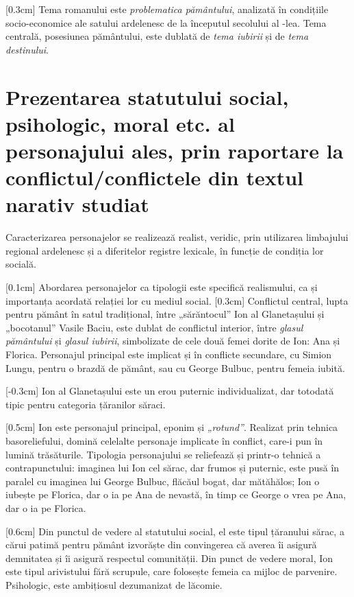 [0.3cm]
Tema romanului este \textit{problematica pământului}, analizată în condițiile so\-ci\-o-e\-co\-no\-mi\-ce ale satului ardelenesc de la începutul secolului al -lea. Tema centrală, posesiunea pământului, este dublată de \textit{tema iubirii} și de \textit{tema destinului}.


{
\hfuzz=0.33pt %
\section{Prezentarea statutului social, psihologic, moral etc. al personajului ales, prin raportare la conflictul/conflictele din textul narativ studiat}
}

Caracterizarea personajelor se realizează realist, veridic, prin utilizarea limbajului regional ardelenesc și a diferitelor registre lexicale, în funcție de condiția lor socială.

[0.1cm]
Abordarea personajelor ca tipologii este specifică realismului, ca și importanța acordată relației lor cu mediul social.
[0.3cm]
Conflictul central, lupta pentru pământ în satul tradițional, între „sărăntocul” Ion al Glanetașului și „bocotanul” Vasile Baciu, este dublat de conflictul interior, între \textit{glasul pământului} și \textit{glasul iubirii}, simbolizate de cele două femei dorite de Ion: Ana și Florica. Personajul principal este implicat și în conflicte secundare, cu Simion Lungu, pentru o brazdă de pământ, sau cu George Bulbuc, pentru femeia iubită.

[-0.3cm]
Ion al Glanetașului este un erou puternic individualizat, dar totodată tipic pentru categoria țăranilor săraci.

[0.5cm]
Ion este personajul principal, eponim și \textit{„rotund”}. Realizat prin tehnica basoreliefului, domină celelalte personaje implicate în conflict, care-i pun în lumină trăsăturile. Tipologia personajului se reliefează și printr-o tehnică a contrapunctului: imaginea lui Ion cel sărac, dar frumos și puternic, este pusă în paralel cu imaginea lui George Bulbuc, flăcăul bogat, dar mătăhălos; Ion o iubește pe Florica, dar o ia pe Ana de nevastă, în timp ce George o vrea pe Ana, dar o ia pe Florica.

[0.6cm]
Din punctul de vedere al statutului social, el este tipul țăranului sărac, a cărui patimă pentru pământ izvorăște din convingerea  că averea îi asigură demnitatea și îi asigură respectul comunității. Din punct de vedere moral, Ion este tipul arivistului fără scrupule, care folosește femeia ca mijloc de parvenire. Psihologic, este ambițiosul dezumanizat de lăcomie.


